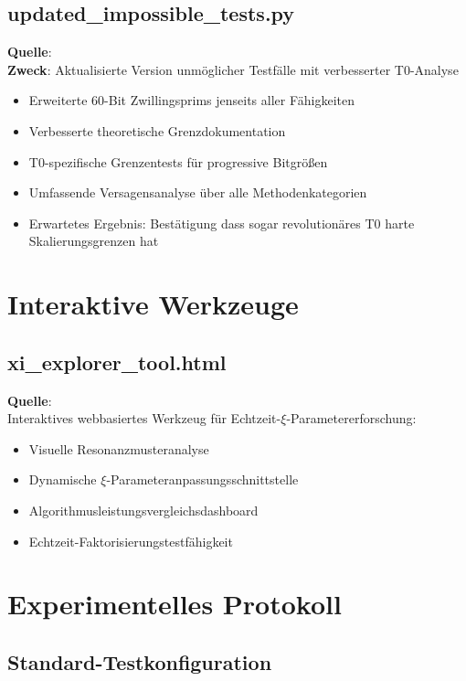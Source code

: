 	\subsection{updated\_impossible\_tests.py}
	\textbf{Quelle}: \\
	\textbf{Zweck}: Aktualisierte Version unmöglicher Testfälle mit verbesserter T0-Analyse
	\begin{itemize}
		\item Erweiterte 60-Bit Zwillingsprims jenseits aller Fähigkeiten
		\item Verbesserte theoretische Grenzdokumentation
		\item T0-spezifische Grenzentests für progressive Bitgrößen
		\item Umfassende Versagensanalyse über alle Methodenkategorien
		\item Erwartetes Ergebnis: Bestätigung dass sogar revolutionäres T0 harte Skalierungsgrenzen hat
	\end{itemize}
	
	\section{Interaktive Werkzeuge}
	
	\subsection{xi\_explorer\_tool.html}
	\textbf{Quelle}: \\
	Interaktives webbasiertes Werkzeug für Echtzeit-$\xi$-Parametererforschung:
	\begin{itemize}
		\item Visuelle Resonanzmusteranalyse
		\item Dynamische $\xi$-Parameteranpassungsschnittstelle
		\item Algorithmusleistungsvergleichsdashboard
		\item Echtzeit-Faktorisierungstestfähigkeit
	\end{itemize}
	
	\section{Experimentelles Protokoll}
	
	\subsection{Standard-Testkonfiguration}
	
